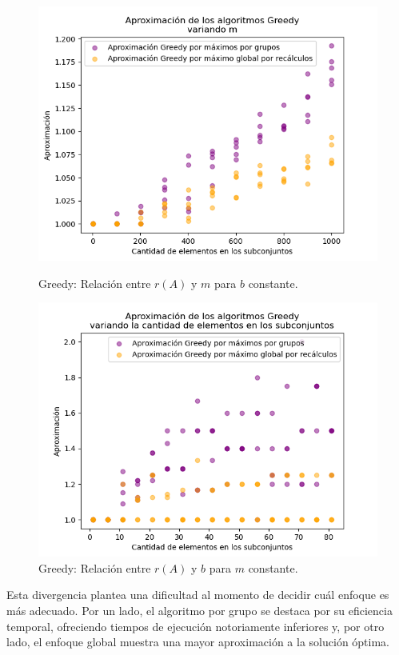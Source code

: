 \begin{figure}[h]
    \centering
    \begin{minipage}{0.45\textwidth}
        \centering
        \includegraphics[width=\textwidth]{img/medicion_r_greedy_var_m.png}
        \caption{Greedy: Relación entre $r(A)$ y $m$ para $b$ constante.}
        \label{fig:medicion_r_greedy_var_m}
    \end{minipage}\hfill
    \begin{minipage}{0.45\textwidth}
        \centering
        \includegraphics[width=\textwidth]{img/medicion_r_greedy_var_b.png}
        \caption{Greedy: Relación entre $r(A)$ y $b$ para $m$ constante.}
        \label{fig:medicion_r_greedy_var_b}
    \end{minipage}
\end{figure}

Esta divergencia plantea una dificultad al momento de decidir cuál enfoque es más adecuado. Por un lado, el algoritmo por grupo se destaca por su eficiencia temporal, ofreciendo tiempos de ejecución notoriamente inferiores y, por otro lado, el enfoque global muestra una mayor aproximación a la solución óptima.